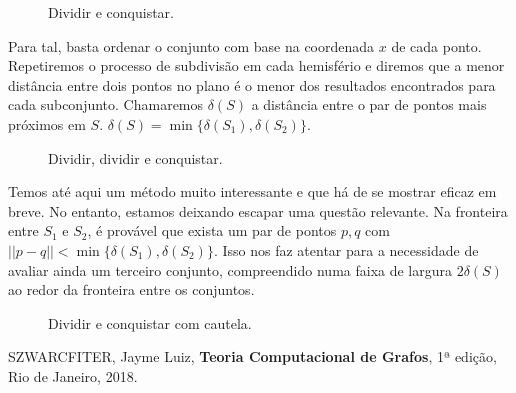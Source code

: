 \documentclass{homework}
\begin{document}
	\begin{figure}[H]
		\centering
		
		\caption{Dividir e conquistar.}
		\label{fig:3.1}
	\end{figure}
	
	Para tal, basta ordenar o conjunto com base na coordenada $x$ de cada ponto. Repetiremos o processo de subdivisão em cada hemisfério e diremos que a menor distância entre dois pontos no plano é o menor dos resultados encontrados para cada subconjunto. Chamaremos $\delta(S)$ a distância entre o par de pontos mais próximos em $S$. $\delta(S) = \min\{\delta(S_1), \delta(S_2)\}$. \par
	
	\begin{figure}[H]
		\centering
		
		\caption{Dividir, dividir e conquistar.}
		\label{fig:3.2}
	\end{figure}
	
	Temos até aqui um método muito interessante e que há de se mostrar eficaz em breve. No entanto, estamos deixando escapar uma questão relevante. Na fronteira entre $S_1$ e $S_2$, é provável que exista um par de pontos $p, q$ com $||p - q|| < \min\{\delta(S_1), \delta(S_2)\}$. Isso nos faz atentar para a necessidade de avaliar ainda um terceiro conjunto, compreendido numa faixa de largura $2 \delta(S)$ ao redor da fronteira entre os conjuntos.
	
	\begin{figure}[H]
		\centering
		
		\caption{Dividir e conquistar com cautela.}
		\label{fig:3.3}
	\end{figure}
	
	\begin{thebibliography}{10}
		 SZWARCFITER, Jayme Luiz, \textbf{Teoria Computacional de Grafos}, 1ª edição, Rio de Janeiro, 2018.
	\end{thebibliography}
	
\end{document}
